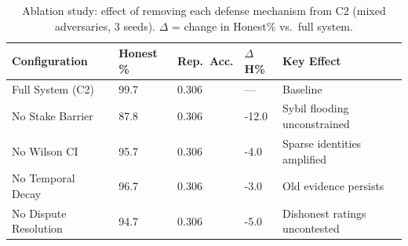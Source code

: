 \begin{table}[t]
\centering
\caption{Ablation study: effect of removing each defense mechanism from C2 (mixed adversaries, 3 seeds). $\Delta$ = change in Honest\% vs.\ full system.}
\label{tab:ablation}
\footnotesize
\renewcommand{\arraystretch}{1.2}
\begin{tabular}{@{}L{2.8cm}C{1.3cm}C{1.3cm}C{1.0cm}L{2.0cm}@{}}
\toprule
\textbf{Configuration} & \textbf{Honest \%} & \textbf{Rep.\ Acc.} & \textbf{$\Delta$H\%} & \textbf{Key Effect} \\
\midrule
Full System (C2) & 99.7 & 0.306 & --- & Baseline \\
No Stake Barrier & 87.8 & 0.306 & -12.0 & Sybil flooding unconstrained \\
No Wilson CI & 95.7 & 0.306 & -4.0 & Sparse identities amplified \\
No Temporal Decay & 96.7 & 0.306 & -3.0 & Old evidence persists \\
No Dispute Resolution & 94.7 & 0.306 & -5.0 & Dishonest ratings uncontested \\
\bottomrule
\end{tabular}
\end{table}